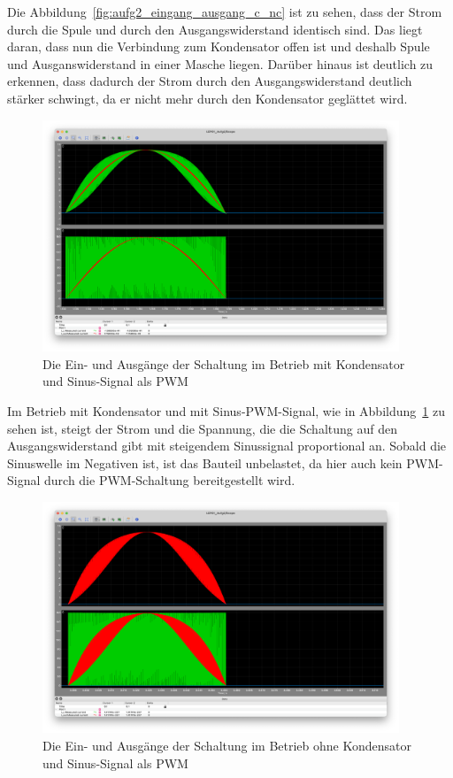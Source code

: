 \documentclass{report}
\begin{document}
Die Abbildung~\ref{fig:aufg2_eingang_ausgang_c_nc} ist zu sehen, dass der Strom durch die Spule und durch den Ausgangswiderstand identisch sind. Das liegt daran, dass nun die Verbindung zum Kondensator offen ist und deshalb Spule und Ausganswiderstand in einer Masche liegen. Darüber hinaus ist deutlich zu erkennen, dass dadurch der Strom durch den Ausgangswiderstand deutlich stärker schwingt, da er nicht mehr durch den Kondensator geglättet wird. 

\begin{figure}[h]
  \begin{center}
    \includegraphics[width=0.95\textwidth]{assets/img/aufg2_eingang_ausgang_sin_wc.png}
  \end{center}
  \caption{Die Ein- und Ausgänge der Schaltung im Betrieb mit Kondensator und Sinus-Signal als PWM}
  \label{fig:aufg2_eingang_ausgang_sin_wc}
\end{figure}

Im Betrieb mit Kondensator und mit Sinus-PWM-Signal, wie in Abbildung~\ref{fig:aufg2_eingang_ausgang_sin_wc} zu sehen ist, steigt der Strom und die Spannung, die die Schaltung auf den Ausgangswiderstand gibt mit steigendem Sinussignal proportional an. Sobald die Sinuswelle im Negativen ist, ist das Bauteil unbelastet, da hier auch kein PWM-Signal durch die PWM-Schaltung bereitgestellt wird. 

\begin{figure}[h]
  \begin{center}
    \includegraphics[width=0.95\textwidth]{assets/img/aufg2_eingang_ausgang_sin_nc.png}
  \end{center}
  \caption{Die Ein- und Ausgänge der Schaltung im Betrieb ohne Kondensator und Sinus-Signal als PWM}
  \label{fig:aufg2_eingang_ausgang_sin_nc}
\end{figure}
\end{document}
